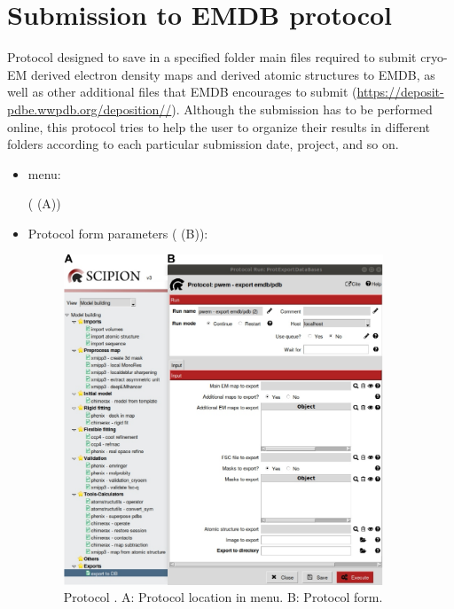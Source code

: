 \section{Submission to EMDB protocol}
\label{app:exportToEMDB}

Protocol designed to save in a specified folder main files required to submit cryo-EM derived electron density maps and derived atomic structures to EMDB, as well as other additional files that EMDB encourages to submit (\url{https://deposit-pdbe.wwpdb.org/deposition//}). Although the submission has to be performed online, this protocol tries to help the user to organize their results in different folders according to each particular submission date, project, and so on.

 \begin{itemize}
  \item \scipion menu:
  
     ( (A))
  
  \item Protocol form parameters ( (B)):
  
    \begin{figure}[H]
     \centering 
     \captionsetup{width=.9\linewidth} 
     \includegraphics[width=0.90\textwidth]{Images_appendix/Fig156.pdf}
     \caption{Protocol . A: Protocol location in \scipion menu. B: Protocol form.}
     \label{fig:export_to_EMDB_1}
    \end{figure}
    

\end{itemize}
